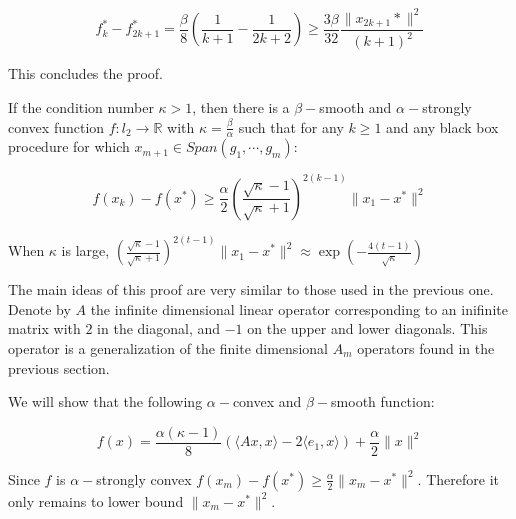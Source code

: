 \begin{equation}
f_k^* - f_{2k+1}^* =\frac{\beta}{8}\left( \frac{1}{k+1} - \frac{1}{2k+2}\right) \geq \frac{3\beta}{32} \frac{\parallel x_{2k+1}*\parallel^2}{(k+1)^2}
\end{equation}

This concludes the proof. 

\proofend









\begin{theorem}
If the condition number $\kappa > 1$, then there is a $\beta-$smooth and $\alpha-$strongly convex function $f: l_2 \rightarrow \mathbb{R}$ with $\kappa = \frac{\beta}{\alpha}$ such that for any $k \geq 1$ and any black box procedure for which $x_{m+1} \in Span( g_1, \cdots, g_m)$:

\begin{equation}
f(x_k) - f(x^*) \geq \frac{\alpha}{2} \left(\frac{ \sqrt{\kappa}-1}{\sqrt{\kappa}+1}\right)^{2(k-1)} \parallel x_1 - x^* \parallel^2
\end{equation}

When $\kappa$ is large, $\left(\frac{ \sqrt{\kappa}-1}{\sqrt{\kappa}+1}\right)^{2(t-1)} \parallel x_1 - x^* \parallel^2 \approx \exp( -\frac{4(t-1)}{\sqrt{\kappa}})$


\end{theorem}

\proofstart

The main ideas of this proof are very similar to those used in the previous one. Denote by $A$ the infinite dimensional linear operator corresponding to an inifinite matrix with $2$ in the diagonal, and $-1$ on the upper and lower diagonals. This operator is a generalization of the finite dimensional $A_m$ operators found in the previous section. 

We will show that the following $\alpha-$convex and $\beta-$smooth function:

\begin{equation}
f(x) = \frac{\alpha(\kappa-1)}{8} \left( \langle Ax, x \rangle - 2\langle e_1, x \rangle \right) + \frac{\alpha}{2} \parallel x \parallel^2
\end{equation}


Since $f$ is $\alpha-$strongly convex $f(x_m) - f(x^*) \geq \frac{\alpha}{2}\parallel x_m - x^*\parallel^2$. Therefore it only remains to lower bound $\parallel x_m - x^*\parallel^2$.

